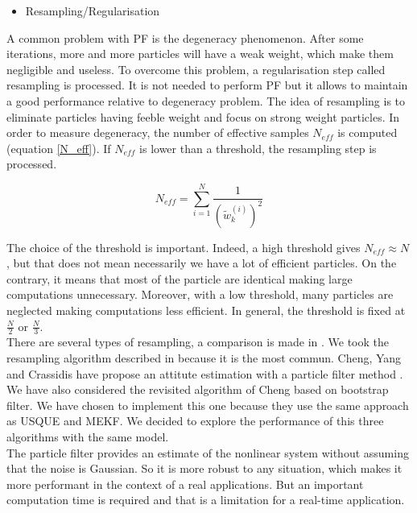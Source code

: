 \documentclass[conference]{IEEEtran}
\begin{document}
\begin{itemize}
\item Resampling/Regularisation
\end{itemize}

A common problem with PF is the degeneracy phenomenon. After some iterations, more and more particles will have a weak weight, which make them negligible and useless.  To overcome this problem, a regularisation step called resampling is processed. It is not needed to perform PF but it allows to maintain a good performance relative to degeneracy problem. The idea of resampling is to eliminate particles having feeble weight and focus on strong weight particles. In order to measure degeneracy, the number of effective samples $N_{eff}$ is computed (equation \ref{N_eff}). If  $N_{eff}$ is lower than a threshold, the resampling step is processed.

\begin{equation}
 N_{eff} = \sum_{i=1}^N\frac{1}{(\tilde{w}_k^{(i)})^2}
 \label{N_eff}
 \end{equation}


The choice of the threshold is important. Indeed, a high threshold gives $N_{eff} \approx N$, but that does not mean necessarily we have a lot of efficient particles. On the contrary, it means that most of the particle are identical making large computations unnecessary. Moreover, with a low threshold, many particles are neglected making computations less efficient. In general, the threshold is fixed at  $\frac{N}{2}$ or $\frac{N}{3}$.\\

There are several types of resampling, a comparison is made in \cite{douc2005comparison}. We took the resampling algorithm described in \cite{arulampalam2002tutorial} because it is the most commun. Cheng, Yang and Crassidis have propose an attitute estimation with a particle filter method \cite{cheng_particle_2010}. We have also considered the revisited algorithm of Cheng \cite{chang_particle_2014} based on bootstrap filter\cite{gordon1993novel}. We have chosen to implement this one because they use the same approach as USQUE \cite{crassidis_unscented_2003} and MEKF\cite{markley2003attitude}. We decided to explore the performance of this three algorithms with the same model. \\

The particle filter provides an estimate of the nonlinear system without assuming that the noise is Gaussian. So it is more robust to any situation, which makes it more performant in the context of a real applications. But an important computation time is required and that is a limitation for a real-time application.
\end{document}
